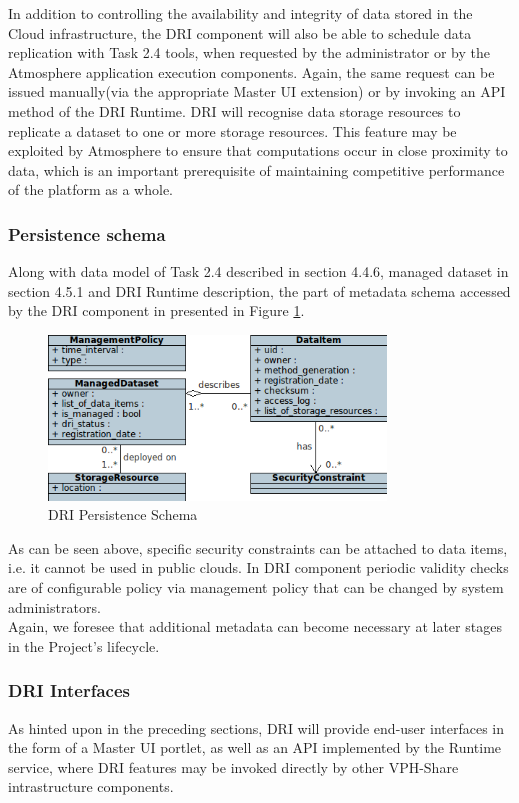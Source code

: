 \documentclass[a4paper,12pt,titlepage]{article}
\begin{document}
\noindent
In addition to controlling the availability and integrity of data stored in the Cloud infrastructure, the DRI component will also be able to schedule data replication with Task 2.4 tools, when requested by the administrator or by the Atmosphere application execution components. Again, the same request can be issued manually(via the appropriate Master UI extension) or by invoking an API method of the DRI Runtime. DRI will recognise data storage resources to replicate a dataset to one or more storage resources. This feature may be exploited by Atmosphere to ensure that computations occur in close proximity to data, which is an important prerequisite of maintaining competitive performance of the platform as a whole.

\subsubsection{Persistence schema}
Along with data model of Task 2.4 described in section 4.4.6, managed dataset in section 4.5.1 and DRI Runtime description, the part of metadata schema accessed by the DRI component in presented in Figure \ref{fig:data-model}.\\

\begin{figure}[h!]
	\centering
	\includegraphics[width=0.8\textwidth]{img/data-model.png}
	\caption{DRI Persistence Schema}
	\label{fig:data-model}
\end{figure}

\noindent
As can be seen above, specific security constraints can be attached to data items, i.e. it cannot be used in public clouds. In DRI component periodic validity checks are of configurable policy via management policy that can be changed by system administrators.\\

\noindent
Again, we foresee that additional metadata can become necessary at later stages in the Project's lifecycle.

\subsubsection{DRI Interfaces}
As hinted upon in the preceding sections, DRI will provide end-user interfaces in the form of a Master UI portlet, as well as an API implemented by the Runtime service, where DRI features may be invoked directly by other VPH-Share intrastructure components.\\
\end{document}
